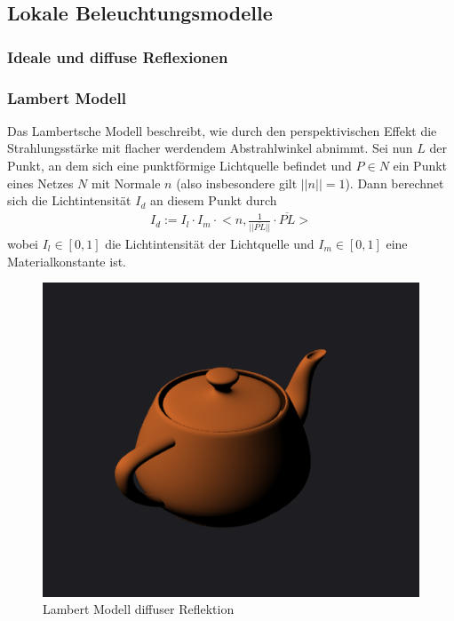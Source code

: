 \subsection{Lokale Beleuchtungsmodelle}
\subsubsection{Ideale und diffuse Reflexionen}
\subsubsection{Lambert  Modell}
Das Lambertsche Modell beschreibt, wie durch den perspektivischen Effekt die Strahlungsstärke mit flacher werdendem Abstrahlwinkel abnimmt. Sei nun $L$ der Punkt, an dem sich eine punktförmige Lichtquelle befindet und $P \in N$ ein Punkt eines Netzes $N$ mit Normale $n$ (also insbesondere gilt $||n|| = 1$).  Dann berechnet sich die Lichtintensität $I_d$ an diesem Punkt durch
\begin{align*}
I_d :=  I_l \cdot I_m \cdot \biggl< n, \frac{1}{||\overline{PL}||} \cdot \overline{PL} \biggr>
\end{align*}
wobei $I_l \in [0,1]$ die Lichtintensität der Lichtquelle und $I_m \in [0,1]$ eine Materialkonstante ist. 
\begin{figure}[H]
    \centering
    \includegraphics[width=1.0\textwidth]{images/lambert.png}
    \caption{Lambert Modell diffuser Reflektion}
    \label{fig:reflection-lambert-diffuse-model}
\end{figure}


